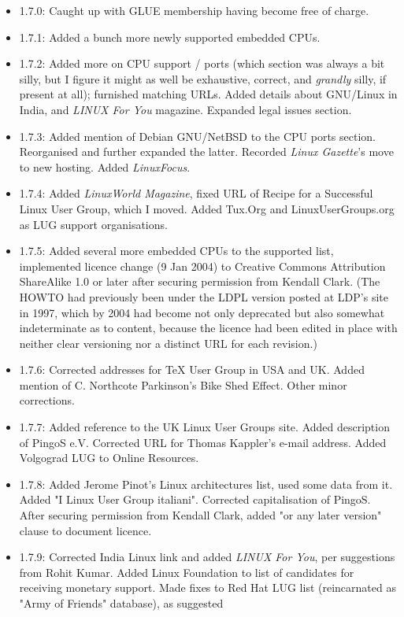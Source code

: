 \documentclass{HOWTO}
\begin{document}
\begin{itemize}
\item 1.7.0: Caught up with GLUE membership having become free
of charge.
\item 1.7.1: Added a bunch more newly supported embedded CPUs.
\item 1.7.2: Added more on CPU support / ports (which section was always a bit silly, but I figure it might as well be exhaustive, correct, and {\itshape grandly\/} silly, if present at all); furnished matching URLs.  Added details about GNU/Linux in India, and {\itshape LINUX For You\/} magazine.  Expanded legal issues section.
\item 1.7.3: Added mention of Debian GNU/NetBSD to the CPU ports 
section.  Reorganised and further expanded the latter.  Recorded {\itshape Linux
Gazette\/}'s move to new hosting.  Added {\itshape LinuxFocus\/}.
\item 1.7.4: Added {\itshape LinuxWorld Magazine\/}, fixed URL of Recipe for
a Successful Linux User Group, which I moved.  Added Tux.Org and 
LinuxUserGroups.org as LUG support organisations.
\item 1.7.5: Added several more embedded CPUs to the supported list, implemented licence change (9 Jan 2004) to Creative Commons Attribution ShareAlike 1.0 or later after securing permission from Kendall Clark. (The HOWTO had previously been under the LDPL version posted at LDP's site in 1997, which by 2004 had become not only deprecated but also somewhat indeterminate as to content, because the licence had been edited in place with neither clear versioning nor a distinct URL for each revision.)
\item 1.7.6: Corrected addresses for TeX User Group in USA and
UK.  Added mention of C. Northcote Parkinson's Bike Shed Effect.  Other 
minor corrections.
\item 1.7.7: Added reference to the UK Linux User Groups site.
Added description of PingoS e.V.  Corrected URL for Thomas Kappler's 
e-mail address.  Added Volgograd LUG to Online Resources.
\item 1.7.8: Added Jerome Pinot's Linux architectures list,
used some data from it.  Added "I Linux User Group italiani".  
Corrected capitalisation of PingoS.  After securing permission from
Kendall Clark, added "or any later version" clause to document licence.
\item 1.7.9: Corrected India Linux link and added 
{\itshape LINUX For You\/}, per suggestions from Rohit Kumar.  Added Linux 
Foundation to list of candidates for receiving monetary support.  Made fixes 
to Red Hat LUG list (reincarnated as "Army of Friends" database), as suggested 

\end{itemize}
\end{document}
